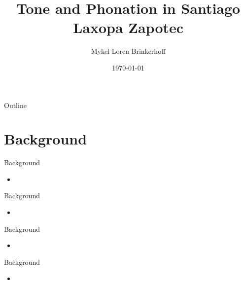 \documentclass[]{beamer}
\title{Tone and Phonation in Santiago Laxopa Zapotec}
\author{Mykel Loren Brinkerhoff}
\institute{UC Santa Cruz}
\date{\today}
\begin{document}
\begin{frame}
    \titlepage
\end{frame}

\begin{frame}{Outline}
    \tableofcontents
\end{frame}

\section{Background}

\begin{frame}{Background}
    \begin{itemize}
        \item 
    \end{itemize}
\end{frame}

\begin{frame}{Background}
    \begin{itemize}
        \item 
    \end{itemize}
\end{frame}

\begin{frame}{Background}
    \begin{itemize}
        \item 
    \end{itemize}
\end{frame}

\begin{frame}{Background}
    \begin{itemize}
        \item 
    \end{itemize}
\end{frame}
\end{document}
